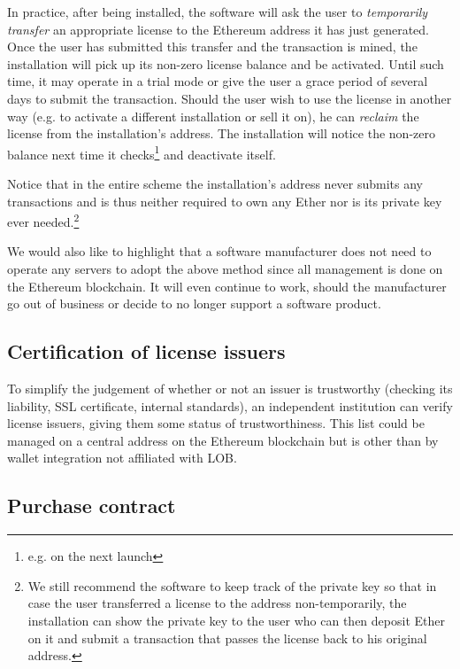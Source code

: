 \documentclass[a4paper]{article}
\begin{document}
In practice, after being installed, the software will ask the user to \emph{temporarily transfer} an appropriate license to the Ethereum address it has just generated. Once the user has submitted this transfer and the transaction is mined, the installation will pick up its non-zero license balance and be activated. Until such time, it may operate in a trial mode or give the user a grace period of several days to submit the transaction. Should the user wish to use the license in another way (e.g. to activate a different installation or sell it on), he can \emph{reclaim} the license from the installation's address. The installation will notice the non-zero balance next time it checks\footnote{e.g. on the next launch} and deactivate itself.

Notice that in the entire scheme the installation's address never submits any transactions and is thus neither required to own any Ether nor is its private key ever needed.\footnote{We still recommend the software to keep track of the private key so that in case the user transferred a license to the address non-temporarily, the installation can show the private key to the user who can then deposit Ether on it and submit a transaction that passes the license back to his original address.}

We would also like to highlight that a software manufacturer does not need to operate any servers to adopt the above method since all management is done on the Ethereum blockchain. It will even continue to work, should the manufacturer go out of business or decide to no longer support a software product.





\subsection{Certification of license issuers}
\label{ch:licenseIssuerValidation}

To simplify the judgement of whether or not an issuer is trustworthy (checking its liability, SSL certificate, internal standards), an independent institution can verify license issuers, giving them some status of trustworthiness. This list could be managed on a central address on the Ethereum blockchain but is other than by wallet integration not affiliated with LOB.





\subsection{Purchase contract}
\label{ch:purchaseContract}
\end{document}
